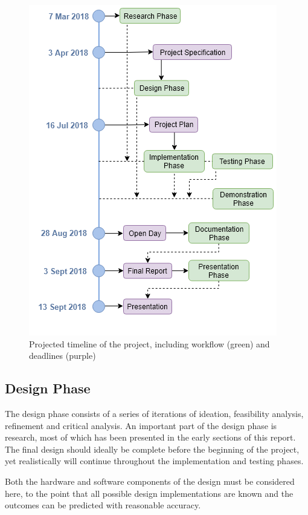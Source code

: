 \documentclass[10pt,twocolumn]{witseiepaper}
\begin{document}
	\begin{figure}
		\centering
		\includegraphics[width=1\columnwidth]{media/timeline.png}
		\caption{Projected timeline of the project, including workflow (green) and deadlines (purple)}
		\raggedright
		\label{fig:timeline}
	\end{figure}
	
	\subsection{Design Phase}
		The design phase consists of a series of iterations of ideation, feasibility analysis, refinement and critical analysis. An important part of the design phase is research, most of which has been presented in the early sections of this report. The final design should ideally be complete before the beginning of the project, yet realistically will continue throughout the implementation and testing phases. 
		
		Both the hardware and software components of the design must be considered here, to the point that all possible design implementations are known and the outcomes can be predicted with reasonable accuracy. 
	
\end{document}

